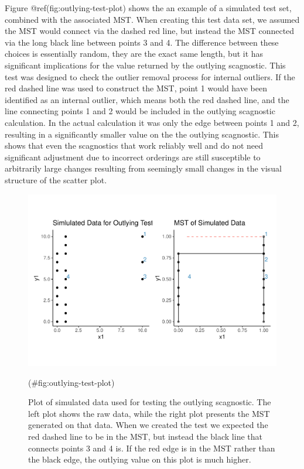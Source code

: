 Figure @ref(fig:outlying-test-plot) shows the an example of a simulated
test set, combined with the associated MST. When creating this test data
set, we assumed the MST would connect via the dashed red line, but
instead the MST connected via the long black line between points 3 and
4. The difference between these choices is essentially random, they are
the exact same length, but it has significant implications for the value
returned by the outlying scagnostic. This test was designed to check the
outlier removal process for internal outliers. If the red dashed line
was used to construct the MST, point 1 would have been identified as an
internal outlier, which means both the red dashed line, and the line
connecting points 1 and 2 would be included in the outlying scagnostic
calculation. In the actual calculation it was only the edge between
points 1 and 2, resulting in a significantly smaller value on the the
outlying scagnostic. This shows that even the scagnostics that work
reliably well and do not need significant adjustment due to incorrect
orderings are still susceptible to arbitrarily large changes resulting
from seemingly small changes in the visual structure of the scatter
plot.

\begin{Schunk}
\begin{figure}
\includegraphics[width=1\linewidth]{mason-lee-laa-cook_files/figure-latex/outlying-test-plot-1} \caption[Plot of simulated data used for testing the outlying scagnostic]{Plot of simulated data used for testing the outlying scagnostic. The left plot shows the raw data, while the right plot presents the MST generated on that data. When we created the test we expected the red dashed line to be in the MST, but instead the black line that connects points 3 and 4 is. If the red edge is in the MST rather than the black edge, the outlying value on this plot is much higher.}(\#fig:outlying-test-plot)
\end{figure}
\end{Schunk}

